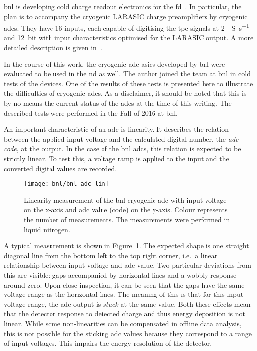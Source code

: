 \gls{bnl} is developing cold charge readout electronics for the \dune{} \gls{fd}~\cite{protodune-sp}.
In particular, the plan is to accompany the cryogenic LARASIC charge preamplifiers by cryogenic \glspl{adc}.
They have \num{16} inputs, each capable of digitising the \gls{tpc} signals at \SI{2}{\mega{}S\per\second} and \SI{12}{bit} with input characteristics optimised for the LARASIC output.
A more detailed description is given in~\cite{bnl_adc}.

In the course of this work, the cryogenic \gls{adc} \glspl{asic} developed by \gls{bnl} were evaluated to be used in the \gls{nd} as well.
The author joined the team at \gls{bnl} in cold tests of the devices.
One of the results of these tests is presented here to illustrate the difficulties of cryogenic \glspl{adc}.
As a disclaimer, it should be noted that this is by no means the current status of the \glspl{adc} at the time of this writing.
The described tests were performed in the Fall of 2016 at \gls{bnl}.

An important characteristic of an \gls{adc} is linearity.
It describes the relation between the applied input voltage and the calculated digital number, the \emph{\gls{adc} code}, at the output.
In the case of the \gls{bnl} \glspl{adc}, this relation is expected to be strictly linear.
To test this, a voltage ramp is applied to the input and the converted digital values are recorded.

\begin{figure}[htb]
	\centering
	\texttt{[image: bnl/bnl\_adc\_lin]}
	\caption[Linearity measurement of  cryogenic  ]{%
		Linearity measurement of the \acrshort{bnl} cryogenic \acrshort{adc}  with input voltage on the x-axis and \acrshort{adc} value (code) on the y-axis.
		Colour represents the number of measurements.
		The measurements were performed in liquid nitrogen.
	}
	\label{fig:bnl_adc_lin}
\end{figure}

A typical measurement is shown in Figure~\ref{fig:bnl_adc_lin}.
The expected shape is one straight diagonal line from the bottom left to the top right corner, i.e.\ a linear relationship between input voltage and \gls{adc} value.
Two particular deviations from this are visible: gaps accompanied by horizontal lines and a wobbly response around zero.
Upon close inspection, it can be seen that the gaps have the same voltage range as the horizontal lines.
The meaning of this is that for this input voltage range, the \gls{adc} output is \emph{stuck} at the same value.
Both these effects mean that the detector response to detected charge and thus energy deposition is not linear.
While some non-linearities can be compensated in offline data analysis, this is not possible for the sticking \gls{adc} values because they correspond to a range of input voltages.
This impairs the energy resolution of the detector.

